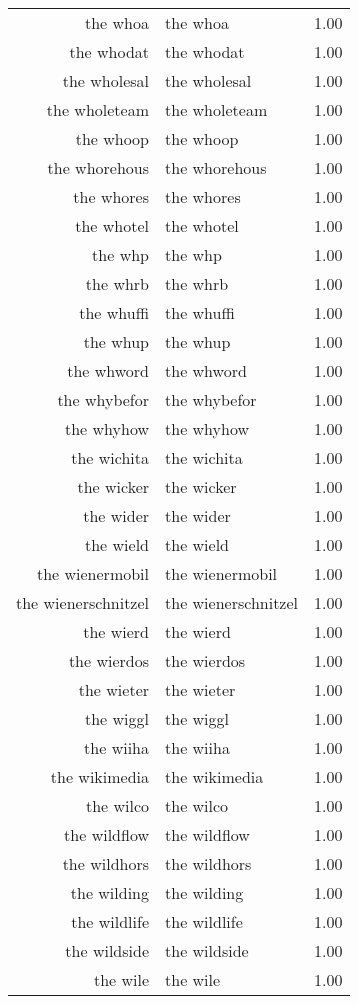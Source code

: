 \begin{table}[ht]
\begin{tabular}{rlr}
  the whoa & the whoa & 1.00 \\ 
  the whodat & the whodat & 1.00 \\ 
  the wholesal & the wholesal & 1.00 \\ 
  the wholeteam & the wholeteam & 1.00 \\ 
  the whoop & the whoop & 1.00 \\ 
  the whorehous & the whorehous & 1.00 \\ 
  the whores & the whores & 1.00 \\ 
  the whotel & the whotel & 1.00 \\ 
  the whp & the whp & 1.00 \\ 
  the whrb & the whrb & 1.00 \\ 
  the whuffi & the whuffi & 1.00 \\ 
  the whup & the whup & 1.00 \\ 
  the whword & the whword & 1.00 \\ 
  the whybefor & the whybefor & 1.00 \\ 
  the whyhow & the whyhow & 1.00 \\ 
  the wichita & the wichita & 1.00 \\ 
  the wicker & the wicker & 1.00 \\ 
  the wider & the wider & 1.00 \\ 
  the wield & the wield & 1.00 \\ 
  the wienermobil & the wienermobil & 1.00 \\ 
  the wienerschnitzel & the wienerschnitzel & 1.00 \\ 
  the wierd & the wierd & 1.00 \\ 
  the wierdos & the wierdos & 1.00 \\ 
  the wieter & the wieter & 1.00 \\ 
  the wiggl & the wiggl & 1.00 \\ 
  the wiiha & the wiiha & 1.00 \\ 
  the wikimedia & the wikimedia & 1.00 \\ 
  the wilco & the wilco & 1.00 \\ 
  the wildflow & the wildflow & 1.00 \\ 
  the wildhors & the wildhors & 1.00 \\ 
  the wilding & the wilding & 1.00 \\ 
  the wildlife & the wildlife & 1.00 \\ 
  the wildside & the wildside & 1.00 \\ 
  the wile & the wile & 1.00 \\ 

\end{tabular}
\end{table}
